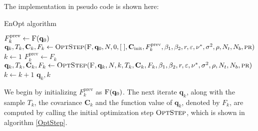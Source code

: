 The implementation in pseudo code is shown here:

\begin{algorithm}[H]%
\caption{\label{EnOptAlg}EnOpt algorithm}
\begin{algorithmic}[1]
\State $F^\mathrm{prev}_{k}\gets \Call{F}{\mathbf{q}_0}$
\State $\mathbf{q}_k,T_k,\mathbf{C}_k,F_k\gets\Call{OptStep}{\textproc{F},\mathbf{q}_0,N,0,[\;],\mathbf{C}_\mathrm{init},F^\mathrm{prev}_{k},\beta_1,\beta_2,r,\varepsilon,\nu^*,\sigma^2,\rho, N_t, N_b, \textproc{pr}}$
\State $k\gets 1$
\State $F^\mathrm{prev}_k\gets F_k$
\State $\mathbf{q}_{k},T_{k},\mathbf{C}_k,F_{k}\gets\Call{OptStep}{\textproc{F},\mathbf{q}_k,N,k,T_k,\mathbf{C}_k,F_k,\beta_1,\beta_2,r,\varepsilon,\nu^*,\sigma^2,\rho, N_t, N_b,\textproc{pr}}$
\State $k\gets k+1$
\EndWhile
\State \Return $\mathbf{q}_k, k$
\EndFunction
\end{algorithmic}
\end{algorithm}

We begin by initializing $F^\mathrm{prev}_{k}$ as $\Call{F}{\mathbf{q}_0}$. The next iterate $\mathbf{q}_k$, along with the sample $T_k$, the covariance $\mathbf{C}_k$ and the function value of $\mathbf{q}_k$, denoted by $F_k$, are computed by calling the initial optimization step $\textproc{OptStep}$, which is shown in algorithm \ref{OptStep}.

